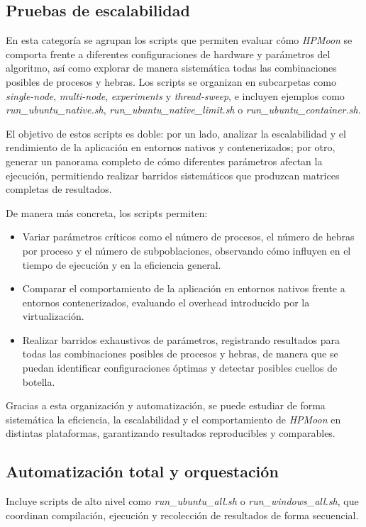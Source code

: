\subsection{Pruebas de escalabilidad}

En esta categoría se agrupan los scripts que permiten evaluar cómo \textit{HPMoon} se comporta frente a diferentes configuraciones de hardware y parámetros del algoritmo, así como explorar de manera sistemática todas las combinaciones posibles de procesos y hebras. Los scripts se organizan en subcarpetas como \textit{single-node}, \textit{multi-node}, \textit{experiments} y \textit{thread-sweep}, e incluyen ejemplos como \textit{run\_ubuntu\_native.sh}, \textit{run\_ubuntu\_native\_limit.sh} o \textit{run\_ubuntu\_container.sh}.

El objetivo de estos scripts es doble: por un lado, analizar la escalabilidad y el rendimiento de la aplicación en entornos nativos y contenerizados; por otro, generar un panorama completo de cómo diferentes parámetros afectan la ejecución, permitiendo realizar barridos sistemáticos que produzcan matrices completas de resultados.

De manera más concreta, los scripts permiten:

\begin{itemize}
    \item Variar parámetros críticos como el número de procesos, el número de hebras por proceso y el número de subpoblaciones, observando cómo influyen en el tiempo de ejecución y en la eficiencia general.
    \item Comparar el comportamiento de la aplicación en entornos nativos frente a entornos contenerizados, evaluando el overhead introducido por la virtualización.
    \item Realizar barridos exhaustivos de parámetros, registrando resultados para todas las combinaciones posibles de procesos y hebras, de manera que se puedan identificar configuraciones óptimas y detectar posibles cuellos de botella.
\end{itemize}

Gracias a esta organización y automatización, se puede estudiar de forma sistemática la eficiencia, la escalabilidad y el comportamiento de \textit{HPMoon} en distintas plataformas, garantizando resultados reproducibles y comparables.

\subsection{Automatización total y orquestación}
Incluye scripts de alto nivel como \textit{run\_ubuntu\_all.sh} o \textit{run\_windows\_all.sh}, que coordinan compilación, ejecución y recolección de resultados de forma secuencial.

